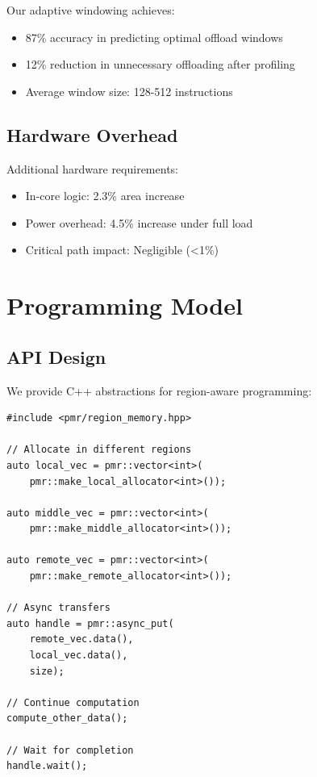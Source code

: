 \documentclass[10pt,conference]{IEEEtran}
\begin{document}
Our adaptive windowing achieves:
\begin{itemize}
    \item 87\% accuracy in predicting optimal offload windows
    \item 12\% reduction in unnecessary offloading after profiling
    \item Average window size: 128-512 instructions
\end{itemize}

\subsection{Hardware Overhead}

Additional hardware requirements:
\begin{itemize}
    \item In-core logic: 2.3\% area increase
    \item Power overhead: 4.5\% increase under full load
    \item Critical path impact: Negligible (<1\%)
\end{itemize}

\section{Programming Model}

\subsection{API Design}

We provide C++ abstractions for region-aware programming:

\begin{lstlisting}[caption={Region-aware memory allocation},label={lst:api}]
#include <pmr/region_memory.hpp>

// Allocate in different regions
auto local_vec = pmr::vector<int>(
    pmr::make_local_allocator<int>());
    
auto middle_vec = pmr::vector<int>(
    pmr::make_middle_allocator<int>());
    
auto remote_vec = pmr::vector<int>(
    pmr::make_remote_allocator<int>());

// Async transfers
auto handle = pmr::async_put(
    remote_vec.data(), 
    local_vec.data(), 
    size);
    
// Continue computation
compute_other_data();

// Wait for completion
handle.wait();
\end{lstlisting}
\end{document}
